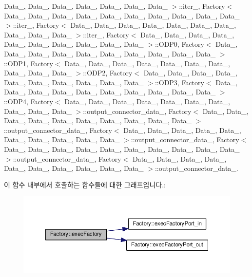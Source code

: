 Data\+\_, Data\+\_, Data\+\_, Data\+\_, Data\+\_, Data\+\_, Data\+\_ $>$\+::iter\+\_, Factory$<$ Data\+\_, Data\+\_, Data\+\_, Data\+\_, Data\+\_, Data\+\_, Data\+\_, Data\+\_, Data\+\_, Data\+\_ $>$\+::iter\+\_, Factory$<$ Data\+\_, Data\+\_, Data\+\_, Data\+\_, Data\+\_, Data\+\_, Data\+\_, Data\+\_, Data\+\_, Data\+\_ $>$\+::iter\+\_, Factory$<$ Data\+\_, Data\+\_, Data\+\_, Data\+\_, Data\+\_, Data\+\_, Data\+\_, Data\+\_, Data\+\_, Data\+\_ $>$\+::\+O\+D\+P0, Factory$<$ Data\+\_, Data\+\_, Data\+\_, Data\+\_, Data\+\_, Data\+\_, Data\+\_, Data\+\_, Data\+\_, Data\+\_ $>$\+::\+O\+D\+P1, Factory$<$ Data\+\_, Data\+\_, Data\+\_, Data\+\_, Data\+\_, Data\+\_, Data\+\_, Data\+\_, Data\+\_, Data\+\_ $>$\+::\+O\+D\+P2, Factory$<$ Data\+\_, Data\+\_, Data\+\_, Data\+\_, Data\+\_, Data\+\_, Data\+\_, Data\+\_, Data\+\_, Data\+\_ $>$\+::\+O\+D\+P3, Factory$<$ Data\+\_, Data\+\_, Data\+\_, Data\+\_, Data\+\_, Data\+\_, Data\+\_, Data\+\_, Data\+\_, Data\+\_ $>$\+::\+O\+D\+P4, Factory$<$ Data\+\_, Data\+\_, Data\+\_, Data\+\_, Data\+\_, Data\+\_, Data\+\_, Data\+\_, Data\+\_, Data\+\_ $>$\+::output\+\_\+connector\+\_\+data\+\_, Factory$<$ Data\+\_, Data\+\_, Data\+\_, Data\+\_, Data\+\_, Data\+\_, Data\+\_, Data\+\_, Data\+\_, Data\+\_ $>$\+::output\+\_\+connector\+\_\+data\+\_, Factory$<$ Data\+\_, Data\+\_, Data\+\_, Data\+\_, Data\+\_, Data\+\_, Data\+\_, Data\+\_, Data\+\_, Data\+\_ $>$\+::output\+\_\+connector\+\_\+data\+\_, Factory$<$ Data\+\_, Data\+\_, Data\+\_, Data\+\_, Data\+\_, Data\+\_, Data\+\_, Data\+\_, Data\+\_, Data\+\_ $>$\+::output\+\_\+connector\+\_\+data\+\_, Factory$<$ Data\+\_, Data\+\_, Data\+\_, Data\+\_, Data\+\_, Data\+\_, Data\+\_, Data\+\_, Data\+\_, Data\+\_ $>$\+::output\+\_\+connector\+\_\+data\+\_.



이 함수 내부에서 호출하는 함수들에 대한 그래프입니다.\+:\nopagebreak
\begin{figure}[H]
\begin{center}
\leavevmode
\includegraphics[width=350pt]{classFactory_aef23e931404b99e10ae4d9b8723e24a6_cgraph}
\end{center}
\end{figure}


